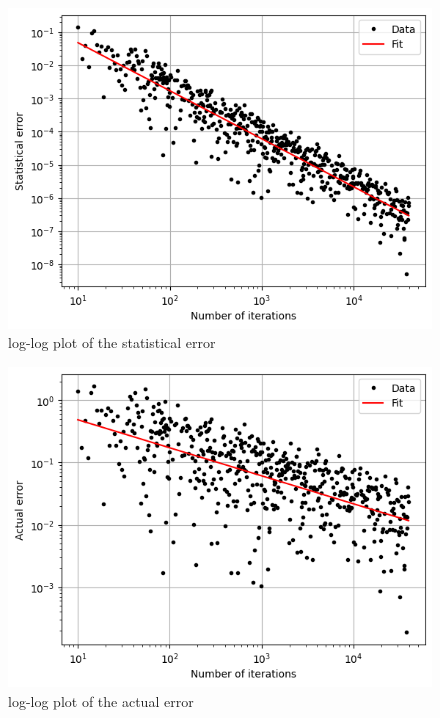 \documentclass{article}
\begin{document}
\begin{figure}[H]
    \centering
    \includegraphics[width=.7\linewidth]{images/Figure2.1.png}
    \caption{log-log plot of the statistical error}
    \label{fig:2.1}
\end{figure}
\begin{figure}[H]
    \centering
    \includegraphics[width=.7\linewidth]{images/Figure2.2.png}
    \caption{log-log plot of the actual error}
    \label{fig:2.2}
\end{figure}
\clearpage
\end{document}
